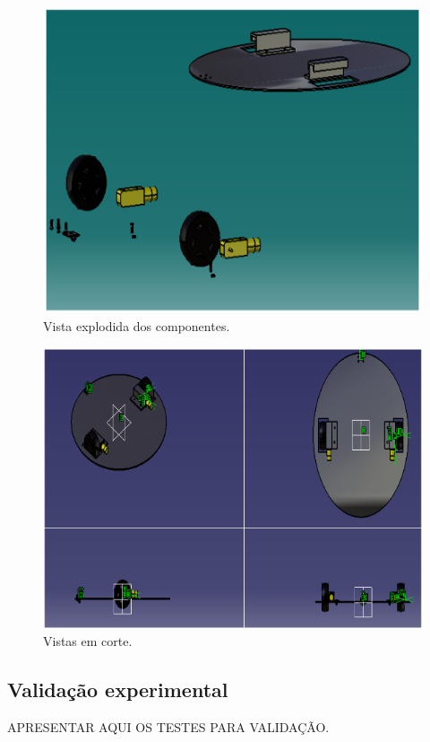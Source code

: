 \begin{figure}[H]
	\centering
	\includegraphics[scale=0.5]{figuras/vista_explodida.png}
	\caption{Vista explodida dos componentes.}
	\label{img:vista_explodida}
\end{figure}

\begin{figure}[H]
	\centering
	\includegraphics[scale=0.5]{figuras/vistas_em_corte.png}
	\caption{Vistas em corte.}
	\label{img:vistas_em_corte}
\end{figure}

\subsection{Validação experimental} %
	\label{sub:validação_experimental}

	APRESENTAR AQUI OS TESTES PARA VALIDAÇÃO.